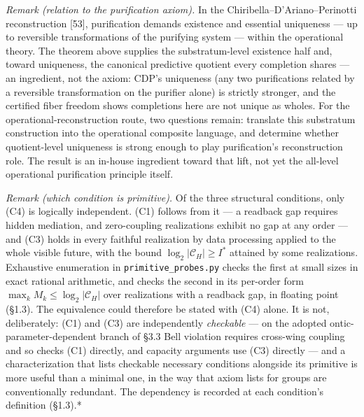 \documentclass[
]{article}
\begin{document}
\emph{Remark (relation to the purification axiom).} In the
Chiribella--D'Ariano--Perinotti reconstruction {[}53{]}, purification
demands existence and essential uniqueness --- up to reversible
transformations of the purifying system --- within the operational
theory. The theorem above supplies the substratum-level existence half
and, toward uniqueness, the canonical predictive quotient every
completion shares --- an ingredient, not the axiom: CDP's uniqueness
(any two purifications related by a reversible transformation on the
purifier alone) is strictly stronger, and the certified fiber freedom
shows completions here are not unique as wholes. For the
operational-reconstruction route, two questions remain: translate this
substratum construction into the operational composite language, and
determine whether quotient-level uniqueness is strong enough to play
purification's reconstruction role. The result is an in-house ingredient
toward that lift, not yet the all-level operational purification
principle itself.

\emph{Remark (which condition is primitive).} Of the three structural
conditions, only (C4) is logically independent. (C1) follows from it ---
a readback gap requires hidden mediation, and zero-coupling realizations
exhibit no gap at any order --- and (C3) holds in every faithful
realization by data processing applied to the whole visible future, with
the bound \(\log_2|\mathcal{C}_H| \geq I^*\) attained by some
realizations. Exhaustive enumeration in \texttt{primitive\_probes.py}
checks the first at small sizes in exact rational arithmetic, and checks
the second in its per-order form
\(\max_k M_k \leq \log_2|\mathcal{C}_H|\) over realizations with a
readback gap, in floating point (§1.3). The equivalence could therefore
be stated with (C4) alone. It is not, deliberately: (C1) and (C3) are
independently \emph{checkable} --- on the adopted
ontic-parameter-dependent branch of §3.3 Bell violation requires
cross-wing coupling and so checks (C1) directly, and capacity arguments
use (C3) directly --- and a characterization that lists checkable
necessary conditions alongside its primitive is more useful than a
minimal one, in the way that axiom lists for groups are conventionally
redundant. The dependency is recorded at each condition's definition
(§1.3).*
\end{document}
